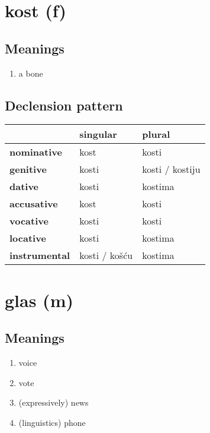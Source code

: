 \filbreak
\section{kost (f)}
\subsection*{Meanings}
\begin{enumerate}
\item a bone
\end{enumerate}
\subsection*{Declension pattern}
\begin{tabularx}{\linewidth}{Xll}
\toprule
{} &       singular &           plural \\
\midrule
\textbf{nominative  } &           kost &            kosti \\
\textbf{genitive    } &          kosti &  kosti / kostiju \\
\textbf{dative      } &          kosti &          kostima \\
\textbf{accusative  } &           kost &            kosti \\
\textbf{vocative    } &          kosti &            kosti \\
\textbf{locative    } &          kosti &          kostima \\
\textbf{instrumental} &  kosti / košću &          kostima \\
\bottomrule
\end{tabularx}

\filbreak
\section{glas (m)}
\subsection*{Meanings}
\begin{enumerate}
\item voice
\item vote
\item (expressively) news
\item (linguistics) phone
\end{enumerate}
